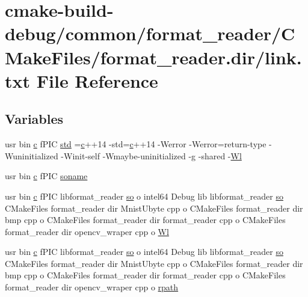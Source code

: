 \hypertarget{common_2format__reader_2CMakeFiles_2format__reader_8dir_2link_8txt}{}\section{cmake-\/build-\/debug/common/format\+\_\+reader/\+C\+Make\+Files/format\+\_\+reader.dir/link.txt File Reference}
\label{common_2format__reader_2CMakeFiles_2format__reader_8dir_2link_8txt}
\subsection*{Variables}
\begin{DoxyCompactItemize}
\item 
usr bin \hyperlink{CMakeCache_8txt_aac1d6a1710812201527c735f7c6afbaa}{c} f\+P\+IC \hyperlink{common_2format__reader_2CMakeFiles_2format__reader_8dir_2link_8txt_a5f87c8f8e33670f7c8c5221b6be1bcc4}{std} =\hyperlink{CMakeCache_8txt_aac1d6a1710812201527c735f7c6afbaa}{c}++14 -\/std=\hyperlink{CMakeCache_8txt_aac1d6a1710812201527c735f7c6afbaa}{c}++14 -\/Werror -\/Werror=return-\/type -\/Wuninitialized -\/Winit-\/self -\/Wmaybe-\/uninitialized -\/g -\/shared -\/\hyperlink{thirdparty_2extension_2CMakeFiles_2cpu__extension_8dir_2link_8txt_af9ccbf658ed2deb89d0d79f211e5b033}{Wl}
\item 
usr bin \hyperlink{CMakeCache_8txt_aac1d6a1710812201527c735f7c6afbaa}{c} f\+P\+IC \hyperlink{common_2format__reader_2CMakeFiles_2format__reader_8dir_2link_8txt_ab65a9b6457c4853ed17f89f945516e66}{soname}
\item 
usr bin \hyperlink{CMakeCache_8txt_aac1d6a1710812201527c735f7c6afbaa}{c} f\+P\+IC libformat\+\_\+reader \hyperlink{CMakeCache_8txt_aa98797039f48d335ee715de4cd92852f}{so} o intel64 Debug lib libformat\+\_\+reader \hyperlink{CMakeCache_8txt_aa98797039f48d335ee715de4cd92852f}{so} C\+Make\+Files format\+\_\+reader dir Mnist\+Ubyte cpp o C\+Make\+Files format\+\_\+reader dir bmp cpp o C\+Make\+Files format\+\_\+reader dir format\+\_\+reader cpp o C\+Make\+Files format\+\_\+reader dir opencv\+\_\+wraper cpp o \hyperlink{common_2format__reader_2CMakeFiles_2format__reader_8dir_2link_8txt_a9ad53fca0052428aab5ca4eb56074e08}{Wl}
\item 
usr bin \hyperlink{CMakeCache_8txt_aac1d6a1710812201527c735f7c6afbaa}{c} f\+P\+IC libformat\+\_\+reader \hyperlink{CMakeCache_8txt_aa98797039f48d335ee715de4cd92852f}{so} o intel64 Debug lib libformat\+\_\+reader \hyperlink{CMakeCache_8txt_aa98797039f48d335ee715de4cd92852f}{so} C\+Make\+Files format\+\_\+reader dir Mnist\+Ubyte cpp o C\+Make\+Files format\+\_\+reader dir bmp cpp o C\+Make\+Files format\+\_\+reader dir format\+\_\+reader cpp o C\+Make\+Files format\+\_\+reader dir opencv\+\_\+wraper cpp o \hyperlink{common_2format__reader_2CMakeFiles_2format__reader_8dir_2link_8txt_a59765fadfe6614a969383e81277046b2}{rpath}
\end{DoxyCompactItemize}


